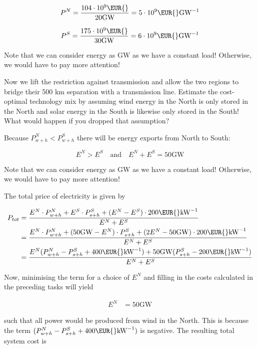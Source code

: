 \documentclass[11pt,a4paper,fleqn]{scrartcl}
\newcommand{\eur}{\text{\EUR{}}}
\begin{document}
\begin{enumerate}[(a)]
 $$P^N = \frac{104 \cdot 10^9 \eur}{20 \si{\giga\watt}} = 5 \cdot 10^9 \eur \si{\per\giga\watt}$$

 $$P^S = \frac{175 \cdot 10^9 \eur}{30 \si{\giga\watt}} = 6 \cdot 10^9 \eur \si{\per\giga\watt}$$

 Note that we can consider energy as $\si{\giga\watt}$ as we have a constant load! Otherwise, we would have to pay more attention!

\begin{shaded}\item Now we lift the restriction against transmission and allow the two regions to bridge their 500 km separation with a transmission line. Estimate the cost-optimal technology mix by assuming wind energy in the North is only stored in the North and solar energy in the South is likewise only stored in the South! What would happen if you dropped that assumption?\end{shaded}

Because $P_{w+h}^N < P_{w+h}^S$ there will be energy exports from North to South:

$$E^N > E^S \quad \text{and} \quad E^N + E^S = 50 \si{\giga\watt}$$

Note that we can consider energy as $\si{\giga\watt}$ as we have a constant load! Otherwise, we would have to pay more attention!

The total price of electricity is given by

\begin{align*}
P_{tot} & =\frac{ E^N \cdot P_{w+h}^N + E^S \cdot P_{s+h}^S + (E^N - E^S)\cdot 200 \eur\si{\per\kilo\watt}}{E^N + E^S}                                           \\
& = \frac{E^N \cdot P_{w+h}^N + (50\si{\giga\watt} - E^N) \cdot P_{s+h}^S + (2E^N - 50\si{\giga\watt})\cdot 200 \eur\si{\per\kilo\watt}}{E^N + E^S}      \\
& = \frac{E^N (P_{w+h}^N - P_{s+h}^S + 400 \eur \si{\per\kilo\watt}) + 50 \si{\giga\watt} (P_{s+h}^S - 200 \eur \si{\per\kilo\watt})}{E^N + E^S} \\
\end{align*}

Now, minimising the term for a choice of $E^N$ and filling in the costs calculated in the preceding tasks will yield

\begin{align*}
E^N & = 50 \si{\giga\watt}
\end{align*}

such that all power would be produced from wind in the North. This is because the term $(P_{w+h}^N - P_{s+h}^S + 400 \eur \si{\per\kilo\watt})$ is negative. The resulting total system cost is


\end{enumerate}
\end{document}
